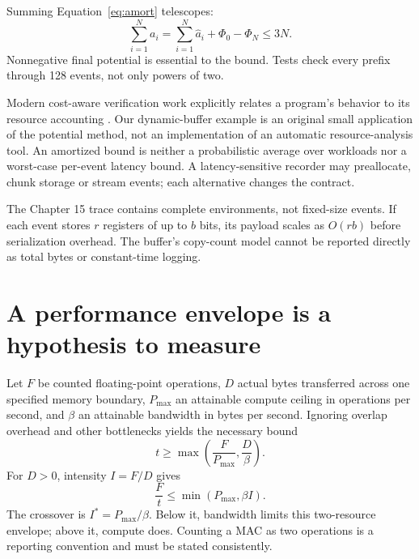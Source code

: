 Summing Equation~\ref{eq:amort} telescopes:
\begin{equation}
 \sum_{i=1}^{N}a_i
 =\sum_{i=1}^{N}\widehat a_i+\Phi_0-\Phi_N
 \leq 3N.
 \label{eq:aggregate}
\end{equation}
Nonnegative final potential is essential to the bound. Tests check every prefix
through 128 events, not only powers of two.

Modern cost-aware verification work explicitly relates a program's behavior
to its resource accounting \cite{potential}. Our dynamic-buffer example is
an original small application of the potential method, not an implementation
of an automatic resource-analysis tool.
An amortized bound is neither a probabilistic average over workloads nor a
worst-case per-event latency bound. A latency-sensitive recorder may preallocate,
chunk storage or stream events; each alternative changes the contract.

The Chapter 15 trace contains complete environments, not fixed-size events.
If each event stores $r$ registers of up to $b$ bits, its payload scales as
$O(rb)$ before serialization overhead. The buffer's copy-count model cannot
be reported directly as total bytes or constant-time logging.

\section{A performance envelope is a hypothesis to measure}
Let $F$ be counted floating-point operations, $D$ actual bytes transferred
across one specified memory boundary, $P_{\max}$ an attainable compute ceiling
in operations per second, and $\beta$ an attainable bandwidth in bytes per
second. Ignoring overlap overhead and other bottlenecks yields the necessary bound
\begin{equation}
 t\geq\max\left(\frac{F}{P_{\max}},\frac D\beta\right).
 \label{eq:time}
\end{equation}
For $D>0$, intensity $I=F/D$ gives
\begin{equation}
 \frac Ft\leq\min(P_{\max},\beta I).
 \label{eq:roof}
\end{equation}
The crossover is $I^*=P_{\max}/\beta$. Below it, bandwidth limits this
two-resource envelope; above it, compute does. Counting a MAC as two operations
is a reporting convention and must be stated consistently.


